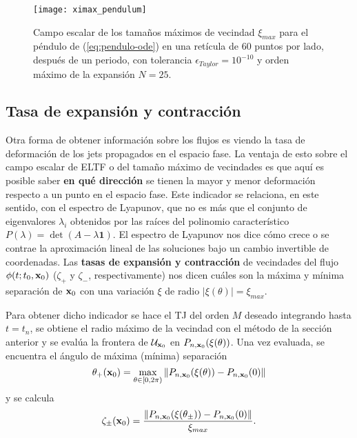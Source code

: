 \begin{figure}[h!]
 \centering
 \texttt{[image: ximax\_pendulum]}
 \caption{Campo escalar de los tamaños máximos de vecindad $\xi_{max}$ para el péndulo de (\ref{eq:pendulo-ode}) en una retícula de $60$ puntos por lado, después de un periodo, con tolerancia $\epsilon_{Taylor} = 10^{-10}$ y orden máximo de la expansión $N = 25$.}
 \label{fig:ximax_pendulum}
\end{figure}


\subsection{Tasa de expansión y contracción}
\label{sec:contraccion_expansion}

Otra forma de obtener información sobre los flujos es viendo la tasa de deformación de los jets propagados en el espacio fase. La ventaja de esto sobre el campo escalar de ELTF o del tamaño máximo de vecindades es que aquí es posible saber \textbf{en qué dirección} se tienen la mayor y menor deformación respecto a un punto en el espacio fase. Este indicador se relaciona, en este sentido, con el espectro de Lyapunov, que no es más que el conjunto de eigenvalores $\lambda_i$ obtenidos por las raíces del polinomio característico $P(\lambda) = \det(A - \lambda\mathbf{1})$. El espectro de Lyapunov nos dice cómo crece o se contrae la aproximación lineal de las soluciones bajo un cambio invertible de coordenadas. Las \textbf{tasas de expansión y contracción} de vecindades del flujo $\phi(t;t_0,\mathbf{x}_0)$ ($\zeta_+$ y $\zeta_-$, respectivamente) nos dicen cuáles son la máxima y mínima separación de $\mathbf{x}_0$ con una variación $\xi$ de radio $|\xi(\theta)| = \xi_{max}$.

Para obtener dicho indicador se hace el TJ del orden $M$ deseado integrando hasta $t = t_n$, se obtiene el radio máximo de la vecindad con el método de la sección anterior y se evalúa la frontera de $\mathcal{U}_{\mathbf{x}_0}$ en $P_{n,\mathbf{x}_0}(\xi(\theta))$. Una vez evaluada, se encuentra el ángulo de máxima (mínima) separación 
\begin{equation}
 \theta_{+}(\mathbf{x}_0) = \max_{\theta \in [0,2\pi)} \left\lVert P_{n,\mathbf{x}_0}(\xi(\theta)) - P_{n,\mathbf{x}_0}(0) \right\rVert
\end{equation} 
y se calcula 
\begin{equation}
 \zeta_{\pm}(\mathbf{x}_0) = \frac{ \left\lVert P_{n,\mathbf{x}_0}(\xi(\theta_{\pm})) - P_{n,\mathbf{x}_0}(0)\right\rVert }{\xi_{max}}.
 \label{eq:max_min_rate}
\end{equation}

